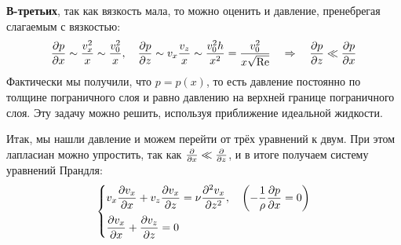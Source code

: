 \textbf{В-третьих}, так как вязкость мала, то можно оценить и давление, пренебрегая слагаемым с вязкостью:
\begin{equation}
    \pdv{p}{x}\sim \frac{v_x^2}{x} \sim \frac{v_0^2}{x}, \quad
    \pdv{p}{z}\sim v_x \frac{v_z}{x} \sim \frac{v_0^2 h}{x^2}=
    \frac{v_0^2}{x \sqrt{\Re}} 
    \quad\Rightarrow\quad 
    \pdv{p}{z} \ll \pdv{p}{x}
\end{equation}
Фактически мы получили, что $p=p(x)$, то есть давление постоянно по толщине пограничного слоя и равно давлению на верхней границе пограничного слоя. Эту задачу можно решить, используя приближение идеальной жидкости.

Итак, мы нашли давление и можем перейти от трёх уравнений к двум. При этом лапласиан можно упростить, так как $\pdv{x} \ll \pdv{z}$, и в итоге получаем систему уравнений Прандля:
\begin{gather}
	\label{eq:prandtl}
    \left\{\begin{aligned}
        &v_x \pdv{v_x}{x}+v_z\pdv{v_x}{z}=\nu\pdv[2]{v_x}{z}, \quad
        \qty(-\frac{1}{\rho}\pdv{p}{x}=0)\\
        &\pdv{v_x}{x}+\pdv{v_z}{z}=0
    \end{aligned}\right.
    \end{gather}




